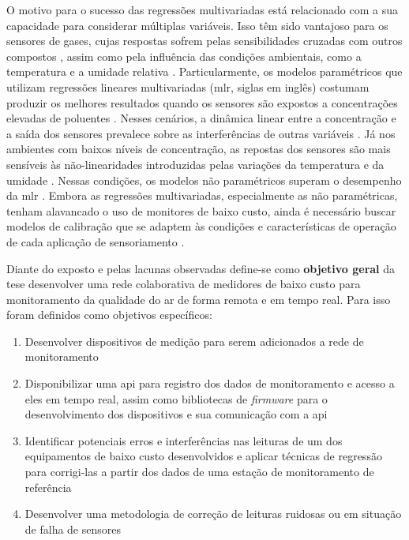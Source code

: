 O motivo para o sucesso das regressões multivariadas está relacionado com a sua capacidade para considerar múltiplas variáveis. Isso têm sido vantajoso para os sensores de gases, cujas respostas sofrem pelas sensibilidades cruzadas com outros compostos \cite{Lewis2018Low-costApplications}, assim como pela influência das condições ambientais, como a temperatura \cite{Popoola2016DevelopmentStability} e a umidade relativa \cite{Pang2018TheMonitoring}. Particularmente, os modelos paramétricos que utilizam regressões lineares multivariadas (\gls{mlr}, siglas em inglês) \cite{Spinelle2015FieldDioxide} costumam produzir os melhores resultados quando os sensores são expostos a concentrações elevadas de poluentes \cite{Karagulian2019ReviewMonitoring}. Nesses cenários, a dinâmica linear entre a concentração e a saída dos sensores prevalece sobre as interferências de outras variáveis \cite{Hagan2018CalibrationInstruments}. Já nos ambientes com baixos níveis de concentração, as repostas dos sensores são mais sensíveis às não-linearidades introduzidas pelas variações da temperatura e da umidade \cite{Hagan2018CalibrationInstruments}. Nessas condições, os modelos não paramétricos superam o desempenho da \gls{mlr} \cite{Karagulian2019ReviewMonitoring}. Embora as regressões multivariadas, especialmente as não paramétricas, tenham alavancado o uso de monitores de baixo custo, ainda é necessário buscar modelos de calibração que se adaptem às condições e características de operação de cada aplicação de sensoriamento \cite{Concas2021LOW-COSTPREPRINT}.

Diante do exposto e pelas lacunas observadas define-se como \textbf{objetivo geral} da tese desenvolver uma rede colaborativa de medidores de baixo custo para monitoramento da qualidade do ar de forma remota e em tempo real. Para isso foram definidos como objetivos específicos:

\begin{enumerate}
    \item Desenvolver dispositivos de medição para serem adicionados a rede de monitoramento
    \item Disponibilizar uma \acrshort{api} para registro dos dados de monitoramento e acesso a eles em tempo real, assim como bibliotecas de \textit{firmware} para o desenvolvimento dos dispositivos e sua comunicação com a \acrshort{api}
    \item Identificar potenciais erros e interferências nas leituras de um dos equipamentos de baixo custo desenvolvidos e aplicar técnicas de regressão para corrigi-las a partir dos dados de uma estação de monitoramento de referência
    \item Desenvolver uma metodologia de correção de leituras ruidosas ou em situação de falha de sensores
\end{enumerate}

